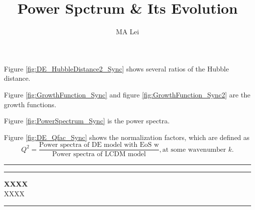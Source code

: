 \documentclass{article}
\begin{document}
\title{Power Spctrum \& Its Evolution}
\author{MA Lei}
\maketitle





Figure \ref{fig:DE_HubbleDistance2_Sync} shows several ratios of the Hubble distance.
 
 
Figure \ref{fig:GrowthFunction_Sync} and figure \ref{fig:GrowthFunction_Sync2} are the growth functions.

Figure \ref{fig:PowerSpectrum_Sync} is the power spectra.

Figure \ref{fig:DE_Qfac_Sync} shows the normalization factors, which are defined as 
\begin{equation}
Q^2=\frac{\text{Power spectra of DE model with EoS w}}{\text{Power spectra of LCDM model}}, \text{at some wavenumber $k$.}
\end{equation}


\newpage    %
\hrule\vspace{1pt}\hrule
\begin{center}
\mbox{{\bf XXXX}} \\
\vspace{0.5em}
\mbox{{XXXX}}
\end{center}
\hrule
\end{document}
